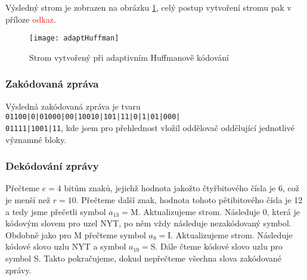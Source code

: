 Výsledný strom je zobrazen na obrázku \ref{adaptivniHuffmanStrom}, celý postup vytvoření stromu pak v příloze \textcolor{red}{odkaz}. 

\begin{figure}[!htb]
\centering
\texttt{[image: adaptHuffman]}
\caption{Strom vytvořený při adaptivním Huffmanově kódování}
\label{adaptivniHuffmanStrom}
\end{figure}

\subsubsection{Zakódovaná zpráva}
Výsledná zakódovaná zpráva je tvaru \texttt{01100|0|01000|00|10010|101|11|0|1|01|000|\\01111|1001|11}, kde jsem pro přehlednost vložil oddělovač \uv{\texttt{|}} oddělující jednotlivé vý\-zna\-mné bloky.

\subsubsection{Dekódování zprávy}
Přečteme $e=4$ bitům znaků, jejichž hodnota jakožto čtyřbitového čísla je 6, což je menší než $r=10$. Přečteme další znak, hodnota tohoto pětibitového čísla je 12 a tedy jsme přečetli symbol $a_{13} = \mathrm{M}$. Aktualizujeme strom. Následuje 0, která je kódovým slovem pro uzel NYT, po něm vždy následuje nezakódovaný symbol. Obdobně jako pro M přečteme symbol $a_8 = \mathrm{I}$. Aktualizujeme strom. Následuje kódové slovo uzlu NYT a symbol $a_{19} = \mathrm{S}$. Dále čteme kódové slovo uzlu pro symbol S. Takto pokračujeme, dokud nepřečteme všechna slova zakódované zprávy.